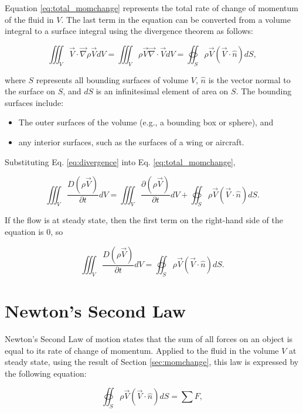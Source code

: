 \documentclass[11pt]{article}
\begin{document}
Equation \ref{eq:total_momchange} represents the total rate of change of
momentum of the fluid in $V$. The last term in the equation can
be converted from a volume integral to a surface integral using the divergence
theorem as follows:

\begin{equation}
\iiint_V\vec{V}\cdot\vec{\nabla}\rho\vec{V}dV = 
\iiint_V\rho\vec{V}\vec{\nabla}\cdot\vec{V}dV = 
\oiint_S\rho\vec{V}(\vec{V}\cdot\hat{n})dS,
\label{eq:divergence}
\end{equation}

\noindent where $S$ represents all bounding surfaces of volume $V$, $\hat{n}$
is the vector normal to the surface on $S$, and $dS$ is an infinitesimal element
of area on $S$. The bounding surfaces include:

\begin{itemize}
  \item The outer surfaces of the volume (e.g., a bounding box or sphere), and
  \item any interior surfaces, such as the surfaces of a wing or aircraft.
\end{itemize}

Substituting Eq. \ref{eq:divergence} into Eq. \ref{eq:total_momchange},

\begin{equation}
\iiint_V\frac{D(\rho\vec{V})}{\partial t}dV = 
\iiint_V\frac{\partial(\rho\vec{V})}{\partial t}dV +
\oiint_S\rho\vec{V}(\vec{V}\cdot\hat{n})dS.
\end{equation}

\noindent If the flow is at steady state, then the first term on the right-hand
side of the equation is 0, so

\begin{equation}
\iiint_V\frac{D(\rho\vec{V})}{\partial t}dV = 
\oiint_S\rho\vec{V}(\vec{V}\cdot\hat{n})dS.
\label{eq:momrate}
\end{equation}

\section{Newton's Second Law}

Newton's Second Law of motion states that the sum of all forces on an object is
equal to its rate of change of momentum. Applied to the fluid in the volume $V$
at steady state, using the result of Section \ref{sec:momchange}, this law is
expressed by the following equation:

\begin{equation}
\oiint_S\rho\vec{V}(\vec{V}\cdot\hat{n})dS = \sum{F},
\end{equation}
\end{document}
